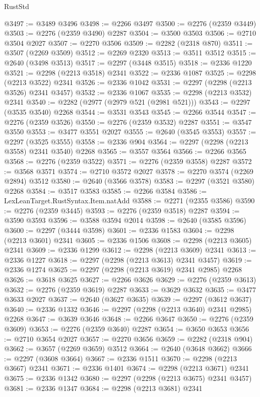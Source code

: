\begin{lexlean}{RustStd}
\begin{coremodule}
{\begin{coremodule}
{{{{{{{{{{{{{{{{{{{{{{{{{{{{{{{{{{{{{{{{{{{{{{{{{{{{{{@3497 := @3489 @3496
@3498 := @2266 @3497
@3500 := @2276 (@2359 @3449)
@3503 := @2276 (@2359 @3490) @2287
@3504 := @3500 @3503
@3506 := @2710 @3504 @2027
@3507 := @2270 @3506
@3509 := @2282 (@2318 @870)
@3511 := @3507 (@2269 @3509)
@3512 := @2269 @2320
@3513 := @3511 @3512
@3515 := @2640 (@3498 @3513)
@3517 := @2297 (@3448 @3515)
@3518 := @2336 @1220
@3521 := @2298 (@2213 @3518) @2341
@3522 := @2336 @1087
@3525 := @2298 (@2213 @3522) @2341
@3526 := @2336 @1042
@3531 := @2297 (@2298 (@2213 @3526) @2341 @3457)
@3532 := @2336 @1067
@3535 := @2298 (@2213 @3532) @2341
@3540 := @2282 (@2977 (@2979 @521 (@2981 @521)))
@3543 := @2297 (@3535 @3540) @2268
@3544 := @3531 @3543
@3545 := @2266 @3544
@3547 := @2276 (@2359 @3526)
@3550 := @2276 (@2359 @3532) @2287
@3551 := @3547 @3550
@3553 := @3477 @3551 @2027
@3555 := @2640 (@3545 @3553)
@3557 := @2297 (@3525 @3555)
@3558 := @2336 @904
@3564 := @2297 (@2298 (@2213 @3558) @2341 @3540) @2268
@3565 := @3557 @3564
@3566 := @2266 @3565
@3568 := @2276 (@2359 @3522)
@3571 := @2276 (@2359 @3558) @2287
@3572 := @3568 @3571
@3574 := @2710 @3572 @2027
@3578 := @2270 @3574 (@2269 @2894) @3512
@3580 := @2640 (@3566 @3578)
@3583 := @2297 (@3521 @3580) @2268
@3584 := @3517 @3583
@3585 := @2266 @3584
@3586 := LexLeanTarget.RustSyntax.Item.natAdd
@3588 := @2271 (@2355 @3586)
@3590 := @2276 (@2359 @3445)
@3593 := @2276 (@2359 @3518) @2287
@3594 := @3590 @3593
@3596 := @3588 @3594 @2014
@3598 := @2640 (@3585 @3596)
@3600 := @2297 (@3444 @3598)
@3601 := @2336 @1583
@3604 := @2298 (@2213 @3601) @2341
@3605 := @2336 @1506
@3608 := @2298 (@2213 @3605) @2341
@3609 := @2336 @1299
@3612 := @2298 (@2213 @3609) @2341
@3613 := @2336 @1227
@3618 := @2297 (@2298 (@2213 @3613) @2341 @3457)
@3619 := @2336 @1274
@3625 := @2297 (@2298 (@2213 @3619) @2341 @2985) @2268
@3626 := @3618 @3625
@3627 := @2266 @3626
@3629 := @2276 (@2359 @3613)
@3632 := @2276 (@2359 @3619) @2287
@3633 := @3629 @3632
@3635 := @3477 @3633 @2027
@3637 := @2640 (@3627 @3635)
@3639 := @2297 (@3612 @3637)
@3640 := @2336 @1332
@3646 := @2297 (@2298 (@2213 @3640) @2341 @2985) @2268
@3647 := @3639 @3646
@3648 := @2266 @3647
@3650 := @2276 (@2359 @3609)
@3653 := @2276 (@2359 @3640) @2287
@3654 := @3650 @3653
@3656 := @2710 @3654 @2027
@3657 := @2270 @3656
@3659 := @2282 (@2318 @904)
@3662 := @3657 (@2269 @3659) @3512
@3664 := @2640 (@3648 @3662)
@3666 := @2297 (@3608 @3664)
@3667 := @2336 @1511
@3670 := @2298 (@2213 @3667) @2341
@3671 := @2336 @1401
@3674 := @2298 (@2213 @3671) @2341
@3675 := @2336 @1342
@3680 := @2297 (@2298 (@2213 @3675) @2341 @3457)
@3681 := @2336 @1347
@3684 := @2298 (@2213 @3681) @2341
}}}}}}}}}}}}}}}}}}}}}}}}}}}}}}}}}}}}}}}}}}}}}}}}}}}}}}
\end{coremodule}}
\end{coremodule}
\end{lexlean}
